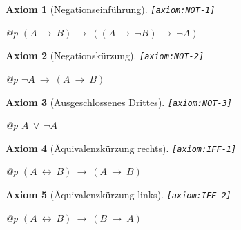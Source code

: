 \documentclass[a4paper,german,10pt,twoside]{book}
\newtheorem{ax}{Axiom}
\theoremstyle{definition}
\theoremstyle{remark}
\begin{document}
\begin{ax}[Negationseinf{\"u}hrung]
\label{axiom:NOT-1} \hypertarget{axiom:NOT-1}{}
{\tt \tiny [\verb]axiom:NOT-1]]}
\mbox{}
\begin{longtable}{{@{\extracolsep{\fill}}p{\linewidth}}}
\centering $(A\ \rightarrow\ B)\ \rightarrow\ ((A\ \rightarrow\ \neg B)\ \rightarrow\ \neg A)$
\end{longtable}

\end{ax}


\begin{ax}[Negationsk{\"u}rzung]
\label{axiom:NOT-2} \hypertarget{axiom:NOT-2}{}
{\tt \tiny [\verb]axiom:NOT-2]]}
\mbox{}
\begin{longtable}{{@{\extracolsep{\fill}}p{\linewidth}}}
\centering $\neg A\ \rightarrow\ (A\ \rightarrow\ B)$
\end{longtable}

\end{ax}


\begin{ax}[Ausgeschlossenes Drittes]
\label{axiom:NOT-3} \hypertarget{axiom:NOT-3}{}
{\tt \tiny [\verb]axiom:NOT-3]]}
\mbox{}
\begin{longtable}{{@{\extracolsep{\fill}}p{\linewidth}}}
\centering $A\ \lor\ \neg A$
\end{longtable}

\end{ax}


\begin{ax}[{\"A}quivalenzk{\"u}rzung rechts]
\label{axiom:IFF-1} \hypertarget{axiom:IFF-1}{}
{\tt \tiny [\verb]axiom:IFF-1]]}
\mbox{}
\begin{longtable}{{@{\extracolsep{\fill}}p{\linewidth}}}
\centering $(A\ \leftrightarrow\ B)\ \rightarrow\ (A\ \rightarrow\ B)$
\end{longtable}

\end{ax}


\begin{ax}[{\"A}quivalenzk{\"u}rzung links]
\label{axiom:IFF-2} \hypertarget{axiom:IFF-2}{}
{\tt \tiny [\verb]axiom:IFF-2]]}
\mbox{}
\begin{longtable}{{@{\extracolsep{\fill}}p{\linewidth}}}
\centering $(A\ \leftrightarrow\ B)\ \rightarrow\ (B\ \rightarrow\ A)$
\end{longtable}

\end{ax}
\end{document}
